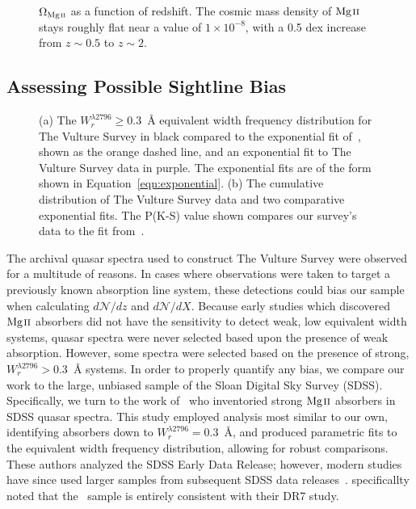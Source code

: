 \documentclass[iop,apj,numberedappendix,appendixfloats,twocolappendix]{emulateapj}
\begin{document}
\begin{figure}[bth]
\caption{$\Omega_{\hbox{\scriptsize {\MgII}}}$ as a function of redshift. The cosmic mass density of ${\hbox{{\rm Mg}\kern 0.1em{\sc ii}}}$ stays roughly flat near a value of $1 \times 10^{-8}$, with a 0.5 dex increase from $z \sim 0.5$ to $z \sim 2$.}
\label{fig:omegamgii}
\end{figure}

\subsection{Assessing Possible Sightline Bias}

\begin{figure*}[bth]
\caption{(a) The $W_r^{\lambda2796} \ge 0.3$~{\AA} equivalent width frequency distribution for The Vulture Survey in black compared to the exponential fit of~\cite{Nestor2005}, shown as the orange dashed line, and an exponential fit to The Vulture Survey data in purple. The exponential fits are of the form shown in Equation~\ref{eqn:exponential}. (b) The cumulative distribution of The Vulture Survey data and two comparative exponential fits. The P(K-S) value shown compares our survey's data to the fit from~\cite{Nestor2005}. }
\label{fig:bias}
\end{figure*}

The archival quasar spectra used to construct The Vulture Survey were observed for a multitude of reasons. In cases where observations were taken to target a previously known absorption line system, these detections could bias our sample when calculating $d\mathcal{N}\!/dz$ and $d\mathcal{N}\!/dX$. Because early studies which discovered ${\hbox{{\rm Mg}\kern 0.1em{\sc ii}}}$ absorbers did not have the sensitivity to detect weak, low equivalent width systems, quasar spectra were never selected based upon the presence of weak absorption. However, some spectra were selected based on the presence of strong, $W_r^{\lambda2796} > 0.3$~{\AA} systems. In order to properly quantify any bias, we compare our work to the large, unbiased sample of the Sloan Digital Sky Survey (SDSS). Specifically, we turn to the work of~\cite{Nestor2005} who inventoried strong ${\hbox{{\rm Mg}\kern 0.1em{\sc ii}}}$ absorbers in SDSS quasar spectra. This study employed analysis most similar to our own, identifying absorbers down to $W_r^{\lambda2796} = 0.3$~{\AA}, and produced parametric fits to the equivalent width frequency distribution, allowing for robust comparisons. These authors analyzed the SDSS Early Data Release; however, modern studies have since used larger samples from subsequent SDSS data releases~\citep{Prochter2006a,Lundgren2009,Quider2011,Seyffert2013,Zhu2013,Raghunathan2016}. \cite{Zhu2013} specificallty noted that the~\cite{Nestor2005} sample is entirely consistent with their DR7 study.
\end{document}
